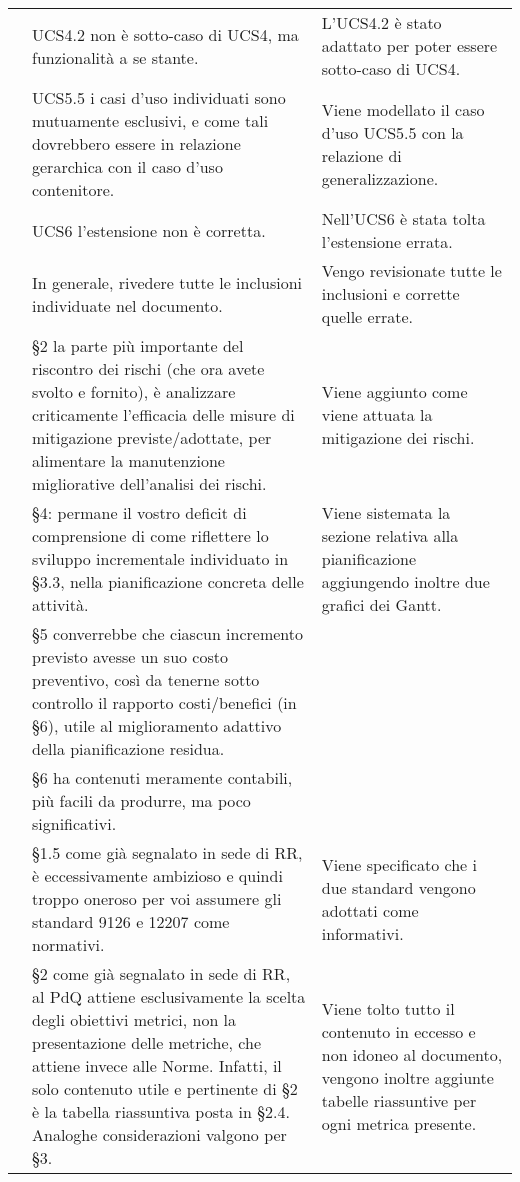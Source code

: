 {\begin{longtable}{ C{2cm} C{6cm} C{6cm}}
		\AdR & UCS4.2 non è sotto-caso di UCS4, ma funzionalità a se stante. & L'UCS4.2 è stato adattato per poter essere sotto-caso di UCS4.\\
		
		\AdR & UCS5.5 i casi d’uso individuati sono mutuamente esclusivi, e come tali dovrebbero essere in relazione gerarchica con il caso d’uso contenitore. & Viene modellato il caso d'uso UCS5.5 con la relazione di generalizzazione.\\
		
		\AdR & UCS6 l’estensione non è corretta. & Nell'UCS6 è stata tolta l'estensione errata.\\
		
		\AdR & In generale, rivedere tutte le inclusioni individuate nel documento.& Vengo revisionate tutte le inclusioni e corrette quelle errate.\\
		
		\PdP & §2 la parte più importante del riscontro dei rischi (che ora avete svolto e fornito), è analizzare criticamente l’efficacia delle misure di mitigazione previste/adottate, per alimentare la manutenzione migliorative dell’analisi dei rischi. & Viene aggiunto come viene attuata la mitigazione dei rischi. \\
		
		\PdP & §4: permane il vostro deficit di comprensione di come riflettere lo
		sviluppo incrementale individuato in §3.3, nella pianificazione concreta delle
		attività. & Viene sistemata la sezione relativa alla pianificazione aggiungendo inoltre due grafici dei Gantt.\\
		
		\PdP & §5 converrebbe che ciascun incremento previsto avesse un suo costo preventivo, così da tenerne sotto controllo il rapporto costi/benefici (in §6), utile al miglioramento adattivo della pianificazione residua. & \\
		
		\PdP & §6 ha contenuti meramente contabili, più facili da produrre, ma poco significativi.& \\
		
		\PdQ & §1.5 come già segnalato in sede di RR, è eccessivamente ambizioso e quindi troppo oneroso per voi assumere gli standard 9126 e 12207 come normativi. & Viene specificato che i due standard vengono adottati come informativi.\\
		
		\PdQ & §2 come già segnalato in sede di RR, al PdQ attiene esclusivamente la
		scelta degli obiettivi metrici, non la presentazione delle metriche, che attiene invece alle Norme. Infatti, il solo contenuto utile e pertinente di §2 è la tabella riassuntiva posta in §2.4. Analoghe considerazioni valgono per §3. & Viene tolto tutto il contenuto in eccesso e non idoneo al documento, vengono inoltre aggiunte tabelle riassuntive per ogni metrica presente.\\
		

\end{longtable}}

